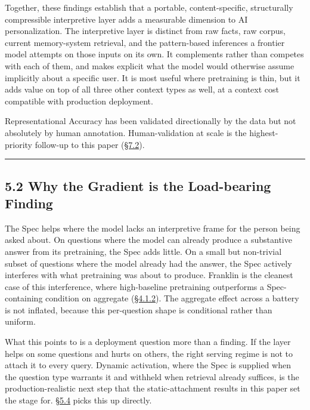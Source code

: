Together, these findings establish that a portable, content-specific,
structurally compressible interpretive layer adds a measurable dimension
to AI personalization. The interpretive layer is distinct from raw
facts, raw corpus, current memory-system retrieval, and the
pattern-based inferences a frontier model attempts on those inputs on
its own. It complements rather than competes with each of them, and
makes explicit what the model would otherwise assume implicitly about a
specific user. It is most useful where pretraining is thin, but it adds
value on top of all three other context types as well, at a context cost
compatible with production deployment.

Representational Accuracy has been validated directionally by the data
but not absolutely by human annotation. Human-validation at scale is the
highest-priority follow-up to this paper (\hyperref[measurement-methodology]{§7.2}).

\begin{center}\rule{0.5\linewidth}{0.5pt}\end{center}

\hypertarget{why-the-gradient-is-the-load-bearing-finding}{%
\subsection{5.2 Why the Gradient is the Load-bearing
Finding}\label{why-the-gradient-is-the-load-bearing-finding}}

The Spec helps where the model lacks an interpretive frame for the
person being asked about. On questions where the model can already produce a substantive
answer from its pretraining, the Spec adds little. On a small but
non-trivial subset of questions where the model already had the answer,
the Spec actively interferes with what pretraining was about to produce.
Franklin is the cleanest case of this interference, where high-baseline
pretraining outperforms a Spec-containing condition on aggregate
(\hyperref[the-gradient-at-the-high-baseline-end-franklin-reference]{§4.1.2}). The aggregate effect across a battery is not inflated, because
this per-question shape is conditional rather than uniform.

What this points to is a deployment question more than a finding. If the
layer helps on some questions and hurts on others, the right serving
regime is not to attach it to every query. Dynamic activation, where the
Spec is supplied when the question type warrants it and withheld when
retrieval already suffices, is the production-realistic next step that
the static-attachment results in this paper set the stage for. \hyperref[composition-with-retrieval]{§5.4}
picks this up directly.

